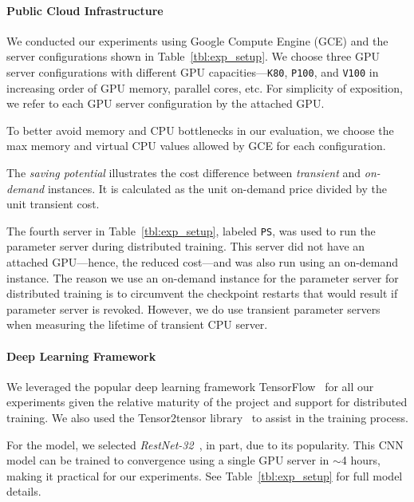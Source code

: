 \paragraph{Public Cloud Infrastructure} 

We conducted our experiments using Google Compute Engine (GCE) and the server
configurations shown in Table~\ref{tbl:exp_setup}. We choose three GPU server
configurations with different GPU capacities---\texttt{K80}, \texttt{P100}, and
\texttt{V100} in increasing order of GPU memory, parallel cores, etc.   For simplicity of
exposition, we refer to each GPU server configuration by the attached  GPU.

To better avoid memory and CPU bottlenecks in our evaluation, we choose the max
memory and virtual CPU values allowed by GCE for each
configuration. 

The \emph{saving potential} illustrates the cost difference between 
\emph{transient} and \emph{on-demand} instances. It is calculated as the unit on-demand price divided
by the unit transient cost. 

The fourth server in Table~\ref{tbl:exp_setup}, labeled \texttt{PS}, was used
to run the parameter server during distributed training. This server did not
have an attached GPU---hence, the reduced cost---and was also run using an
on-demand instance.  The reason we use an on-demand instance for the parameter
server for distributed training is to circumvent the checkpoint restarts that would result if
parameter server is revoked. %
However, we do use transient parameter servers
when measuring the lifetime of transient CPU server. 

\paragraph{Deep Learning Framework} 

We leveraged the popular deep learning framework TensorFlow~\cite{tensorflow} for all our
experiments given the relative maturity of the project and support for distributed training. 
We also used the Tensor2tensor library~\cite{tensor2tensor} to assist in the training process. 

For the model, we selected  \emph{RestNet-32}~\cite{resnet}, in part, due to its popularity. This 
CNN model can be trained to convergence using a single GPU server in $\sim$4
hours, making it practical for our experiments.  See Table~\ref{tbl:exp_setup}
for full model details.  

